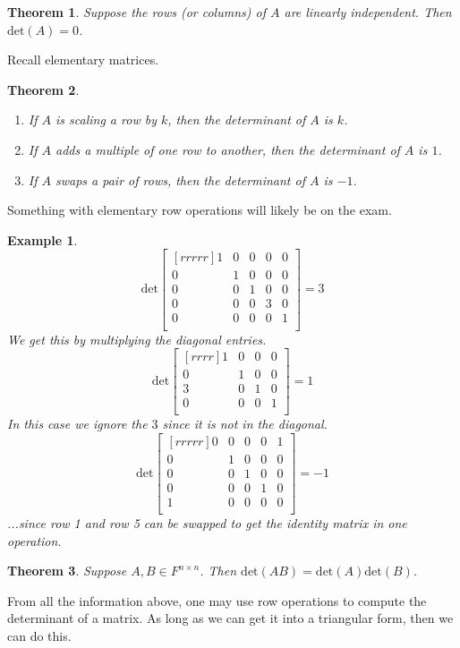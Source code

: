\documentclass{report}
\newtheorem*{ex}{Example}
\newtheorem*{thrm}{Theorem}
\begin{document}
\begin{thrm}
Suppose the rows (or columns) of $A$ are linearly independent. Then $\mathrm{det}(A)=0$.
\end{thrm}
Recall elementary matrices.
\begin{thrm}
\begin{enumerate}
\item If $A$ is scaling a row by $k$, then the determinant of $A$ is $k$.
\item If $A$ adds a multiple of one row to another, then the determinant of $A$ is $1$.
\item If $A$ swaps a pair of rows, then the determinant of $A$ is $-1$.
\end{enumerate}
\end{thrm}
Something with elementary row operations will likely be on the exam.
\begin{ex}
\[ \mathrm{det}\begin{bmatrix}[rrrrr]1&0&0&0&0\\0&1&0&0&0\\0&0&1&0&0\\0&0&0&3&0\\0&0&0&0&1\\\end{bmatrix} = 3 \]
We get this by multiplying the diagonal entries.
\[ \mathrm{det}\begin{bmatrix}[rrrr]1&0&0&0\\0&1&0&0\\3&0&1&0\\0&0&0&1\\\end{bmatrix} = 1 \]
In this case we ignore the $3$ since it is not in the diagonal.
\[ \mathrm{det}\begin{bmatrix}[rrrrr]0&0&0&0&1\\0&1&0&0&0\\0&0&1&0&0\\0&0&0&1&0\\1&0&0&0&0\\\end{bmatrix} = -1 \]
...since row 1 and row 5 can be swapped to get the identity matrix in one operation.
\end{ex}
\begin{thrm}
Suppose $A,B\in F^{n\times n}$. Then $\mathrm{det}(AB)=\mathrm{det}(A)\mathrm{det}(B)$.
\end{thrm}
From all the information above, one may use row operations to compute the determinant of a matrix. As long as we can get it into a triangular form, then we can do this.
\end{document}
